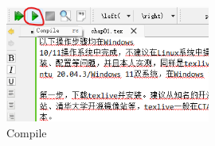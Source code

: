 \begin{figure}[H] 
	\centering
	\includegraphics[width=0.6\textwidth]{image/chap01/f6.png}
	\caption{Compile}
	\label{fig:f6}
\end{figure}